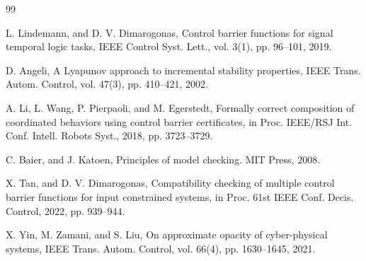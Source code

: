 \documentclass[letterpaper, 10 pt, conference]{ieeeconf}  %
\begin{document}
\begin{thebibliography}{99}

 L. Lindemann, and D. V. Dimarogonas, Control barrier functions for signal temporal logic tasks, IEEE Control Syst. Lett., vol. 3(1), pp. 96--101, 2019.

 D. Angeli, A Lyapunov approach to incremental stability properties, IEEE Trans. Autom. Control, vol. 47(3), pp. 410--421, 2002.

 A. Li, L. Wang, P. Pierpaoli, and M. Egerstedt, Formally correct composition of coordinated behaviors using control barrier certificates, in Proc. IEEE/RSJ Int. Conf. Intell. Robots Syst., 2018, pp. 3723--3729.

 C. Baier, and J. Katoen, Principles of model checking. MIT Press, 2008.

 X. Tan, and D. V. Dimarogonas, Compatibility checking of multiple control barrier functions for input constrained systems, in Proc. 61st IEEE Conf. Decis. Control, 2022, pp. 939--944.

 X. Yin, M. Zamani, and S. Liu, On approximate opacity of cyber-physical systems, IEEE Trans. Autom. Control, vol. 66(4), pp. 1630--1645, 2021.




\end{thebibliography}
\end{document}
